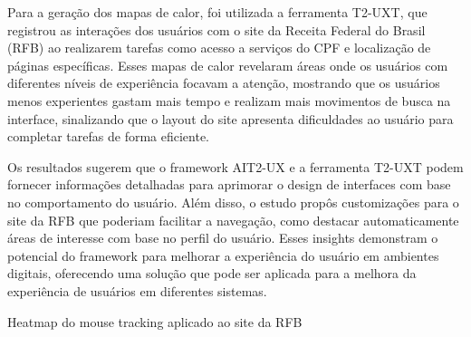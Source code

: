 Para a geração dos mapas de calor, foi utilizada a ferramenta T2-UXT, que registrou as interações dos usuários com o site da Receita Federal do Brasil (RFB) ao realizarem tarefas como acesso a serviços do CPF e localização de páginas específicas. Esses mapas de calor revelaram áreas onde os usuários com diferentes níveis de experiência focavam a atenção, mostrando que os usuários menos experientes gastam mais tempo e realizam mais movimentos de busca na interface, sinalizando que o layout do site apresenta dificuldades ao usuário para completar tarefas de forma eficiente.

Os resultados sugerem que o framework AIT2-UX e a ferramenta T2-UXT podem fornecer informações detalhadas para aprimorar o design de interfaces com base no comportamento do usuário. Além disso, o estudo propôs customizações para o site da RFB que poderiam facilitar a navegação, como destacar automaticamente áreas de interesse com base no perfil do usuário. Esses insights demonstram o potencial do framework para melhorar a experiência do usuário em ambientes digitais, oferecendo uma solução que pode ser aplicada para a melhora da experiência de usuários em diferentes sistemas.

\begin{photograph}[H]
    \centering
    \caption{Heatmap do mouse tracking aplicado ao site da RFB}%
    \label{phot:}
    \end{photograph}
